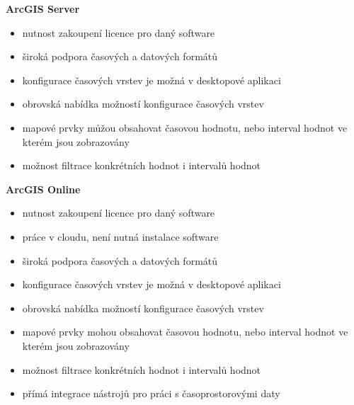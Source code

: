 \textbf{ArcGIS Server}
\begin{itemize}
	\item nutnost zakoupení licence pro daný software
	\item široká podpora časových a datových formátů
	\item konfigurace časových vrstev je možná v desktopové
aplikaci
	\item obrovská nabídka možností konfigurace časových vrstev
	\item mapové prvky můžou obsahovat časovou hodnotu, nebo
interval hodnot ve kterém jsou zobrazovány
	\item možnost filtrace konkrétních hodnot i intervalů hodnot
\end{itemize}

\textbf{ArcGIS Online}
\begin{itemize}
	\item nutnost zakoupení licence pro daný software
	\item práce v cloudu, není nutná instalace software
	\item široká podpora časových a datových formátů
	\item konfigurace časových vrstev je možná v desktopové
aplikaci
	\item obrovská nabídka možností konfigurace časových vrstev
	\item mapové prvky mohou obsahovat časovou hodnotu, nebo
interval hodnot ve kterém jsou zobrazovány
	\item možnost filtrace konkrétních hodnot i intervalů hodnot
	\item přímá integrace nástrojů pro práci s časoprostorovými
daty
\end{itemize}

 




 
